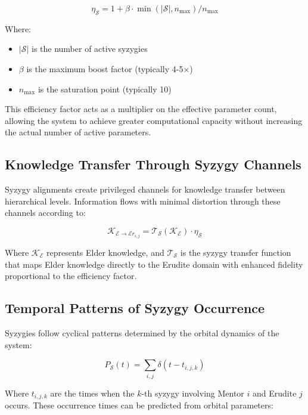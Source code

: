 \begin{equation}
\eta_\mathcal{S} = 1 + \beta \cdot \min(|\mathcal{S}|, n_{\text{max}}) / n_{\text{max}}
\end{equation}

Where:
\begin{itemize}
    \item $|\mathcal{S}|$ is the number of active syzygies
    \item $\beta$ is the maximum boost factor (typically 4-5×)
    \item $n_{\text{max}}$ is the saturation point (typically 10)
\end{itemize}

This efficiency factor acts as a multiplier on the effective parameter count, allowing the system to achieve greater computational capacity without increasing the actual number of active parameters.

\subsection{Knowledge Transfer Through Syzygy Channels}

Syzygy alignments create privileged channels for knowledge transfer between hierarchical levels. Information flows with minimal distortion through these channels according to:

\begin{equation}
\mathcal{K}_{\mathcal{E} \rightarrow \mathcal{E}r_{i,j}} = \mathcal{T}_{\mathcal{S}}(\mathcal{K}_{\mathcal{E}}) \cdot \eta_\mathcal{S}
\end{equation}

Where $\mathcal{K}_{\mathcal{E}}$ represents Elder knowledge, and $\mathcal{T}_{\mathcal{S}}$ is the syzygy transfer function that maps Elder knowledge directly to the Erudite domain with enhanced fidelity proportional to the efficiency factor.

\subsection{Temporal Patterns of Syzygy Occurrence}

Syzygies follow cyclical patterns determined by the orbital dynamics of the system:

\begin{equation}
P_{\mathcal{S}}(t) = \sum_{i,j} \delta(t - t_{i,j,k})
\end{equation}

Where $t_{i,j,k}$ are the times when the $k$-th syzygy involving Mentor $i$ and Erudite $j$ occurs. These occurrence times can be predicted from orbital parameters:

